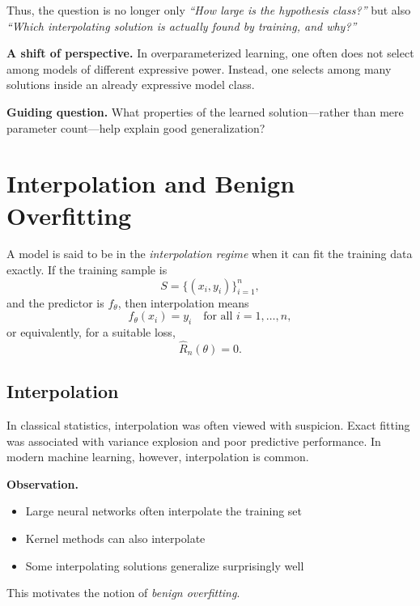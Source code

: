 \medskip

\noindent
Thus, the question is no longer only
\emph{``How large is the hypothesis class?''}
but also
\emph{``Which interpolating solution is actually found by training, and why?''}

\medskip

\noindent
\textbf{A shift of perspective.}
In overparameterized learning, one often does not select among models of different expressive power. Instead, one selects among many solutions inside an already expressive model class.

\medskip

\noindent
\textbf{Guiding question.}
What properties of the learned solution---rather than mere parameter count---help explain good generalization?

\section{Interpolation and Benign Overfitting}

A model is said to be in the \emph{interpolation regime} when it can fit the training data exactly. If the training sample is
\[
S = \{(x_i,y_i)\}_{i=1}^n,
\]
and the predictor is \(f_\theta\), then interpolation means
\[
f_\theta(x_i)=y_i
\quad \text{for all } i=1,\dots,n,
\]
or equivalently, for a suitable loss,
\[
\hat{R}_n(\theta)=0.
\]

\subsection{Interpolation}

In classical statistics, interpolation was often viewed with suspicion. Exact fitting was associated with variance explosion and poor predictive performance. In modern machine learning, however, interpolation is common.

\medskip

\noindent
\textbf{Observation.}
\begin{itemize}
    \item Large neural networks often interpolate the training set
    \item Kernel methods can also interpolate
    \item Some interpolating solutions generalize surprisingly well
\end{itemize}

\medskip

\noindent
This motivates the notion of \emph{benign overfitting}.

